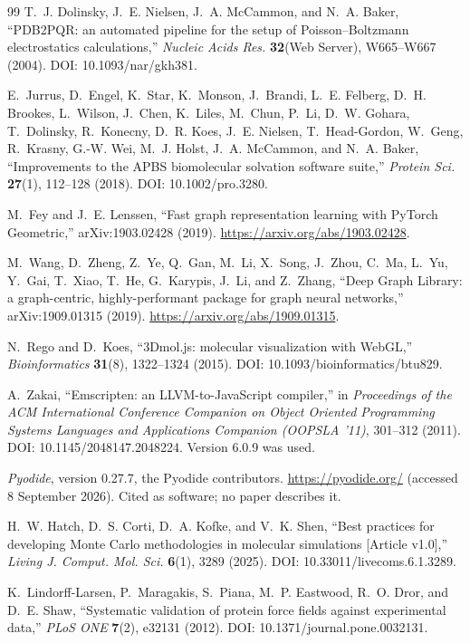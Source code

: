 \begin{thebibliography}{99}
T.~J. Dolinsky, J.~E. Nielsen, J.~A. McCammon, and N.~A. Baker,
``PDB2PQR: an automated pipeline for the setup of Poisson--Boltzmann
electrostatics calculations,''
\emph{Nucleic Acids Res.} \textbf{32}(Web Server), W665--W667 (2004).
DOI: 10.1093/nar/gkh381.

E.~Jurrus, D.~Engel, K.~Star, K.~Monson, J.~Brandi, L.~E. Felberg,
D.~H. Brookes, L.~Wilson, J.~Chen, K.~Liles, M.~Chun, P.~Li, D.~W. Gohara,
T.~Dolinsky, R.~Konecny, D.~R. Koes, J.~E. Nielsen, T.~Head-Gordon, W.~Geng,
R.~Krasny, G.-W. Wei, M.~J. Holst, J.~A. McCammon, and N.~A. Baker,
``Improvements to the APBS biomolecular solvation software suite,''
\emph{Protein Sci.} \textbf{27}(1), 112--128 (2018).
DOI: 10.1002/pro.3280.

M.~Fey and J.~E. Lenssen,
``Fast graph representation learning with PyTorch Geometric,''
arXiv:1903.02428 (2019). \url{https://arxiv.org/abs/1903.02428}.

M.~Wang, D.~Zheng, Z.~Ye, Q.~Gan, M.~Li, X.~Song, J.~Zhou, C.~Ma, L.~Yu,
Y.~Gai, T.~Xiao, T.~He, G.~Karypis, J.~Li, and Z.~Zhang,
``Deep Graph Library: a graph-centric, highly-performant package for graph
neural networks,''
arXiv:1909.01315 (2019). \url{https://arxiv.org/abs/1909.01315}.

N.~Rego and D.~Koes,
``3Dmol.js: molecular visualization with WebGL,''
\emph{Bioinformatics} \textbf{31}(8), 1322--1324 (2015).
DOI: 10.1093/bioinformatics/btu829.

A.~Zakai,
``Emscripten: an LLVM-to-JavaScript compiler,''
in \emph{Proceedings of the ACM International Conference Companion on Object
Oriented Programming Systems Languages and Applications Companion (OOPSLA
'11)}, 301--312 (2011).
DOI: 10.1145/2048147.2048224. Version 6.0.9 was used.

\emph{Pyodide}, version 0.27.7, the Pyodide contributors.
\url{https://pyodide.org/} (accessed 8 September 2026). Cited as software; no
paper describes it.

H.~W. Hatch, D.~S. Corti, D.~A. Kofke, and V.~K. Shen,
``Best practices for developing Monte Carlo methodologies in molecular
simulations [Article v1.0],''
\emph{Living J. Comput. Mol. Sci.} \textbf{6}(1), 3289 (2025).
DOI: 10.33011/livecoms.6.1.3289.

K.~Lindorff-Larsen, P.~Maragakis, S.~Piana, M.~P. Eastwood, R.~O. Dror, and
D.~E. Shaw,
``Systematic validation of protein force fields against experimental data,''
\emph{PLoS ONE} \textbf{7}(2), e32131 (2012).
DOI: 10.1371/journal.pone.0032131.


\end{thebibliography}
